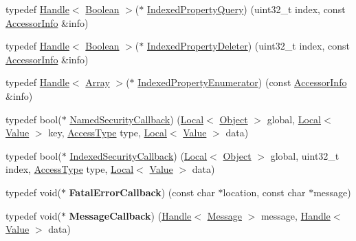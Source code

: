 \begin{DoxyCompactItemize}
\item 
typedef \hyperlink{classv8_1_1_handle}{Handle}$<$ \hyperlink{classv8_1_1_boolean}{Boolean} $>$($\ast$ \hyperlink{namespacev8_a4b360e915c7c5c1591e946f701d7cc28}{Indexed\+Property\+Query}) (uint32\+\_\+t index, const \hyperlink{classv8_1_1_accessor_info}{Accessor\+Info} \&info)
\item 
typedef \hyperlink{classv8_1_1_handle}{Handle}$<$ \hyperlink{classv8_1_1_boolean}{Boolean} $>$($\ast$ \hyperlink{namespacev8_a3a7c18d62a0d1f2d12845051920be592}{Indexed\+Property\+Deleter}) (uint32\+\_\+t index, const \hyperlink{classv8_1_1_accessor_info}{Accessor\+Info} \&info)
\item 
typedef \hyperlink{classv8_1_1_handle}{Handle}$<$ \hyperlink{classv8_1_1_array}{Array} $>$($\ast$ \hyperlink{namespacev8_a15ab299eff53946ab483b762a4cb20dc}{Indexed\+Property\+Enumerator}) (const \hyperlink{classv8_1_1_accessor_info}{Accessor\+Info} \&info)
\item 
typedef bool($\ast$ \hyperlink{namespacev8_aee682f4c3be1abac0f695548f3da7a80}{Named\+Security\+Callback}) (\hyperlink{classv8_1_1_local}{Local}$<$ \hyperlink{classv8_1_1_object}{Object} $>$ global, \hyperlink{classv8_1_1_local}{Local}$<$ \hyperlink{classv8_1_1_value}{Value} $>$ key, \hyperlink{namespacev8_add8bef6469c5b94706584124e610046c}{Access\+Type} type, \hyperlink{classv8_1_1_local}{Local}$<$ \hyperlink{classv8_1_1_value}{Value} $>$ data)
\item 
typedef bool($\ast$ \hyperlink{namespacev8_af8be2a3d30e9f3af21a6e633aba8a2ba}{Indexed\+Security\+Callback}) (\hyperlink{classv8_1_1_local}{Local}$<$ \hyperlink{classv8_1_1_object}{Object} $>$ global, uint32\+\_\+t index, \hyperlink{namespacev8_add8bef6469c5b94706584124e610046c}{Access\+Type} type, \hyperlink{classv8_1_1_local}{Local}$<$ \hyperlink{classv8_1_1_value}{Value} $>$ data)
\item 
\hypertarget{namespacev8_abc93f69508701f18dc5cc0ce165616aa}{}typedef void($\ast$ {\bfseries Fatal\+Error\+Callback}) (const char $\ast$location, const char $\ast$message)\label{namespacev8_abc93f69508701f18dc5cc0ce165616aa}

\item 
\hypertarget{namespacev8_a38b70e3fac4b122af376012f1916b6de}{}typedef void($\ast$ {\bfseries Message\+Callback}) (\hyperlink{classv8_1_1_handle}{Handle}$<$ \hyperlink{classv8_1_1_message}{Message} $>$ message, \hyperlink{classv8_1_1_handle}{Handle}$<$ \hyperlink{classv8_1_1_value}{Value} $>$ data)\label{namespacev8_a38b70e3fac4b122af376012f1916b6de}


\end{DoxyCompactItemize}
